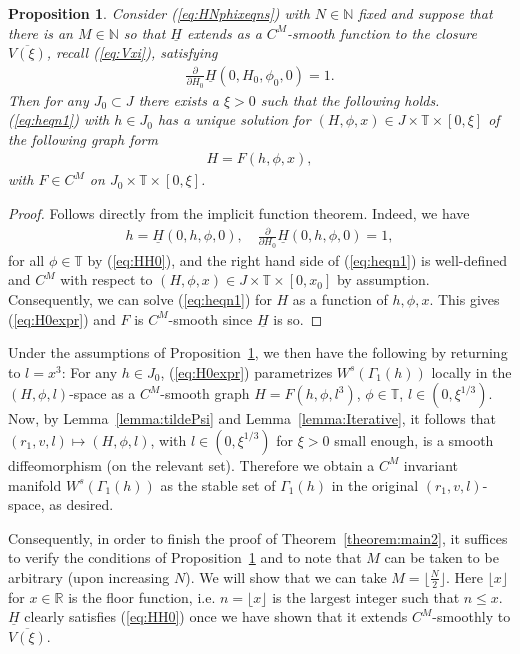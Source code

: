 \documentclass[reqno,12pt]{amsart}
\newcommand{\eqlab}[1]{\label{eq:#1}}
\renewcommand{\eqref}[1]{(\ref{eq:#1})}
\newcommand{\propref}[1]{Proposition~\ref{proposition:#1}}
\newcommand{\proplab}[1]{\label{proposition:#1}}
\newcommand{\lemmaref}[1]{Lemma~\ref{lemma:#1}}
\newcommand{\thmref}[1]{Theorem~\ref{theorem:#1}}
\newtheorem{proposition}[theorem]{Proposition}
\numberwithin{equation}{section}
\begin{document}
\begin{proposition}\proplab{this}
Consider \eqref{HNphixeqns} with $N\in \mathbb N$ fixed and suppose that there is an $M\in \mathbb N$ so that $\underline H$ extends as a $C^M$-smooth function to the closure $\overline{V(\xi)}$, recall \eqref{Vxi}, satisfying 
\begin{align}
 \frac{\partial}{\partial H_0} \underline H(0,H_0,\phi_0,0)=1.\eqlab{HH0}
\end{align}
Then for any $J_0\subset J$ there exists a $\xi>0$ such that the following holds. \eqref{heqn1} with $h\in J_0$ has a unique solution for $(H,\phi,x)\in J\times \mathbb T\times [0,\xi]$ of the following graph form 
 \begin{align}
  H = F(h,\phi,x),\eqlab{H0expr}
 \end{align}
with $F\in C^M$ on $J_0\times \mathbb T\times [0,\xi]$. 
\end{proposition}
\begin{proof}
 Follows directly from the implicit function theorem.  Indeed, we have
 \begin{align*}
  h = \underline H(0,h,\phi,0),\quad \frac{\partial}{\partial H_0}\underline H(0,h,\phi,0)=1,
 \end{align*}
for all $\phi\in \mathbb T$ by \eqref{HH0}, and the right hand side of \eqref{heqn1} is well-defined and $C^M$ with respect to $(H,\phi,x)\in J\times \mathbb T\times [0,x_0]$ by assumption. Consequently, we can solve \eqref{heqn1} for $H$ as a function of $h,\phi,x$. This gives \eqref{H0expr} and $F$ is $C^M$-smooth since $\underline H$ is so.
\end{proof}
Under the assumptions of \propref{this}, we then have the following by returning to $l=x^3$:
For any $h\in J_0$, \eqref{H0expr} parametrizes $W^s(\Gamma_1(h))$ locally in the $(H,\phi,l)$-space as a $C^M$-smooth graph $H=F(h,\phi,l^3)$, $\phi\in \mathbb T$, $l\in (0,\xi^{1/3})$. Now, by \lemmaref{tildePsi} and \lemmaref{Iterative}, it follows that $(r_1,v,l)\mapsto (H,\phi,l)$, with $l\in (0,\xi^{1/3})$ for $\xi>0$ small enough, is a smooth diffeomorphism (on the relevant set). Therefore we obtain a $C^M$ invariant manifold $W^s(\Gamma_1(h))$ as the stable set of $\Gamma_1(h)$ in the original $(r_1,v,l)$-space, as desired.

Consequently, in order to finish the proof of  \thmref{main2}, it suffices to verify the conditions of \propref{this} and to note that $M$ can be taken to be arbitrary (upon increasing $N$). We will show that we can take $M=\lfloor \frac{N}{2}\rfloor$. Here $\lfloor x\rfloor$ for $x\in \mathbb R$ is the floor function, i.e. $n=\lfloor x\rfloor$ is the largest integer such that $n\le x$. $\underline H$ clearly satisfies \eqref{HH0} once we have shown that it extends $C^M$-smoothly to $\overline{ V(\xi)}$.
\end{document}
